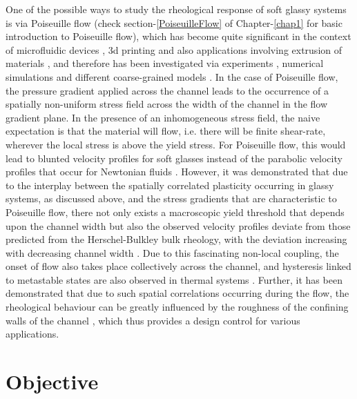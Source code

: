 One of the possible ways to study the rheological response of soft glassy systems is via Poiseuille flow (check section-\ref{PoiseuilleFlow} of Chapter-\ref{chap1} for basic introduction to Poiseuille flow), which has become quite significant in the context of microfluidic devices \cite{tabeling2005introduction}, 3d printing \cite{zhu2019colloidal, nelson2020embedded} and also applications involving extrusion of materials \cite{ebendorff2007extrusion}, and therefore has been investigated via experiments \cite{goyon2008spatial, isa2009velocity, genovese2011crystallization, ballesta2012wall, nordstrom2010microfluidic}, numerical simulations \cite{chaudhuri2012dynamical, mansard2013molecular, pinaki2014, lulli2018metastability} and different coarse-grained models \cite{nicolas2013mesoscopic, papenkort2014channel, lulli2018metastability}. In the case of Poiseuille flow, the pressure gradient applied across the channel leads to the occurrence of a spatially non-uniform stress field across the width of the channel in the flow gradient plane. In the presence of an inhomogeneous stress field, the naive expectation is that  the material will flow, i.e. there will be finite shear-rate, wherever the local stress is above the yield stress. For Poiseuille flow, this would lead to blunted velocity profiles for soft glasses \cite{PhysRevE.77.011504} instead of the parabolic velocity profiles that occur for Newtonian fluids \cite{evansMorrissBook}. However, it was demonstrated that due to the interplay between the spatially correlated plasticity occurring in glassy systems, as discussed above, and the stress gradients that are characteristic to Poiseuille flow, there not only exists a macroscopic yield threshold that depends upon the channel width \cite{chaudhuri2012dynamical} but also the observed velocity profiles  deviate from those predicted from the Herschel-Bulkley bulk rheology, with the deviation increasing with decreasing channel width \cite{goyon2008spatial, mansard2013molecular}. Due to this fascinating non-local coupling, the onset of flow also takes place collectively across the channel, and hysteresis linked to metastable states are also observed in thermal systems \cite{pinaki2014, lulli2018metastability}.  Further, it has been demonstrated that due to such spatial correlations occurring during the flow, the rheological behaviour can be greatly influenced by the roughness of the confining walls of the channel \cite{mansard2014boundary}, which thus provides a design control for various applications. 


\section{Objective}

